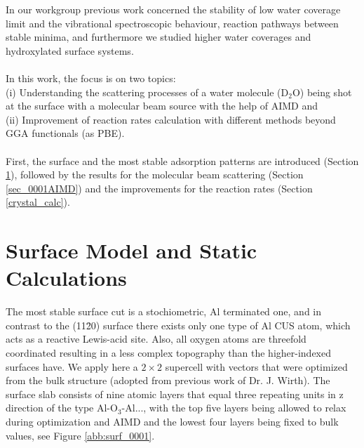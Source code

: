 \documentclass[11pt,DIV=13,BCOR=5mm,a4paper,headinclude]{scrbook}
\begin{document}
In our workgroup previous work concerned the stability of low water coverage limit and the vibrational spectroscopic behaviour, reaction pathways between stable minima, and furthermore we studied higher water coverages and hydroxylated surface systems\cite{WirthJPCC2012,Wirth2014,Wirth2015}.
\\\\

In this work, the focus is on two topics:
\\
(i) Understanding the scattering processes of a water molecule (D$_2$O) being shot at the surface with a molecular beam source with the help of AIMD and
\\
(ii) Improvement of reaction rates calculation with different methods beyond GGA functionals (as PBE).
\\\\
First, the surface and the most stable adsorption patterns are introduced (Section \ref{sec_0001surf}), followed by the results for the molecular beam scattering\cite{Heiden0001_2018} (Section \ref{sec_0001AIMD}) and the improvements for the reaction rates (Section \ref{crystal_calc}).
	
\section{Surface Model and Static Calculations}\label{sec_0001surf}

The most stable surface cut is a stochiometric, Al terminated one, and in contrast to the (11\=20) surface there exists only one type of Al CUS atom, which acts as a reactive Lewis-acid site.
Also, all oxygen atoms are threefold coordinated resulting in a less complex topography than the higher-indexed surfaces have.
We apply here a $2\times 2$ supercell with vectors that were optimized from the bulk structure (adopted from previous work of Dr. J. Wirth\cite{WirthJPCC2012}).
The surface slab consists of nine atomic layers that equal three repeating units in z direction of the type Al-O$_3$-Al..., with the top five layers being allowed to relax during optimization and AIMD and the lowest four layers being fixed to bulk values, see Figure \ref{abb:surf_0001}.
\end{document}
